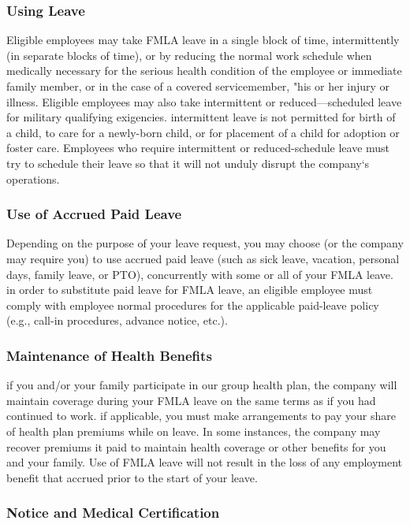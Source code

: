 \subsubsection{Using Leave}

Eligible employees may take FMLA leave in a single block of time, intermittently (in separate blocks of time), or by reducing the normal work schedule when medically necessary for the serious health condition of the employee or immediate family member, or in the case of a covered servicemember, "his or her injury or illness. Eligible employees may also take intermittent or reduced—scheduled leave for military qualifying exigencies. intermittent leave is not permitted for birth of a child, to care for a newly-born child, or for placement of a child for adoption or foster care. Employees who require intermittent or reduced-schedule leave must try to schedule their leave so that it will not unduly disrupt the company‘s operations.

\subsubsection{Use of Accrued Paid Leave}

Depending on the purpose of your leave request, you may choose (or the company may require you) to use accrued paid leave (such as sick leave, vacation, personal days, family leave, or PTO), concurrently with some or all of your FMLA leave. in order to substitute paid leave for FMLA leave, an eligible employee must comply with employee normal procedures for the applicable paid-leave policy (e.g., call-in procedures, advance notice, etc.).

\subsubsection{Maintenance of Health Benefits}

if you and/or your family participate in our group health plan, the company will maintain coverage during your FMLA leave on the same terms as if you had continued to work. if applicable, you must make arrangements to pay your share of health plan premiums while on leave. In some instances, the company may recover premiums it paid to maintain health coverage or other benefits for you and your family. Use of FMLA leave will not result in the loss of any employment benefit that accrued prior to the start of your leave.

\subsubsection{Notice and Medical Certification}

